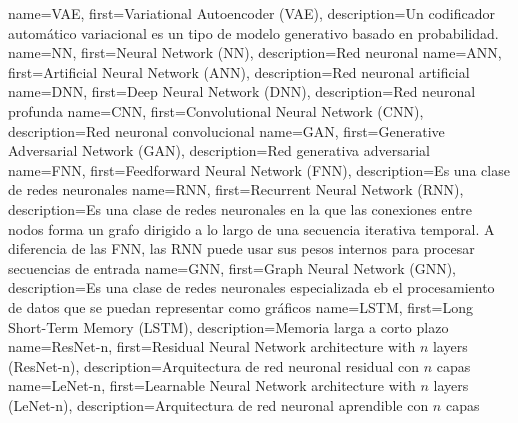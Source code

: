       {name={VAE},        first={Variational Autoencoder (VAE)},                                      description={Un codificador automático variacional es un tipo de modelo generativo basado en probabilidad.}}
       {name={NN},         first={Neural Network (NN)},                                                description={Red neuronal}}
      {name={ANN},        first={Artificial Neural Network (ANN)},                                    description={Red neuronal artificial}}
      {name={DNN},        first={Deep Neural Network (DNN)},                                          description={Red neuronal profunda}}
      {name={CNN},        first={Convolutional Neural Network (CNN)},                                 description={Red neuronal convolucional}}
      {name={GAN},        first={Generative Adversarial Network (GAN)},                               description={Red generativa adversarial}}
      {name={FNN},        first={Feedforward Neural Network (FNN)},                                   description={Es una clase de redes neuronales}}
      {name={RNN},        first={Recurrent Neural Network (RNN)},                                     description={Es una clase de redes neuronales en la que las conexiones entre nodos forma un grafo dirigido a lo largo de una secuencia iterativa temporal. A diferencia de las FNN, las RNN puede usar sus pesos internos para procesar secuencias de entrada}}
      {name={GNN},        first={Graph Neural Network (GNN)},                                         description={Es una clase de redes neuronales especializada eb el procesamiento de datos que se puedan representar como gráficos}}
     {name={LSTM},       first={Long Short-Term Memory (LSTM)},                                      description={Memoria larga a corto plazo}}
 {name={ResNet-n},   first={Residual Neural Network architecture with $n$ layers (ResNet-n)},    description={Arquitectura de red neuronal residual con $n$ capas}}
  {name={LeNet-n},    first={Learnable Neural Network architecture with $n$ layers (LeNet-n)},    description={Arquitectura de red neuronal aprendible con $n$ capas}}

